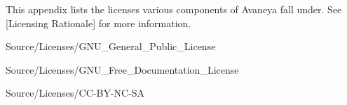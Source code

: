 

This appendix lists the licenses various components of Avaneya fall under. See [Licensing Rationale] for more information.

\component Source/Licenses/GNU_General_Public_License

\page
{}
\component Source/Licenses/GNU_Free_Documentation_License

\page
{}
\component Source/Licenses/CC-BY-NC-SA

